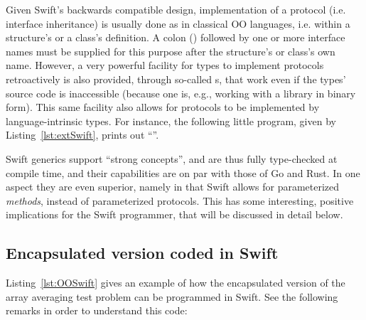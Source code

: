 \documentclass[11pt,oneside]{report}
\newcommand{\code}[1]{{\selectfont\ttfamily{#1}}}
\begin{document}
Given Swift's backwards compatible design, implementation of a
protocol (i.e. interface inheritance) is usually done as in classical
OO languages, i.e. within a structure's or a class's definition. A
colon (\code{:}) followed by one or more interface names must be
supplied for this purpose after the structure's or class's own
name. However, a very powerful facility for types to implement
protocols retroactively is also provided, through so-called
\code{extension}s, that work even if the types' source code is
inaccessible (because one is, e.g., working with a library in binary
form). This same facility also allows for protocols to be implemented
by language-intrinsic types. For instance, the following little
program, given by Listing~\ref{lst:extSwift}, prints out ``\code{I am
  4.9}''.


Swift generics support ``strong concepts'', and are thus fully
type-checked at compile time, and their capabilities are on par with
those of Go and Rust. In one aspect they are even superior, namely in
that Swift allows for parameterized \emph{methods}, instead of
parameterized protocols. This has some interesting, positive
implications for the Swift programmer, that will be discussed in
detail below.

\subsection{Encapsulated version coded in Swift}

Listing~\ref{lst:OOSwift} gives an example of how the encapsulated
version of the array averaging test problem can be programmed in
Swift. See the following remarks in order to understand this code:
\end{document}

